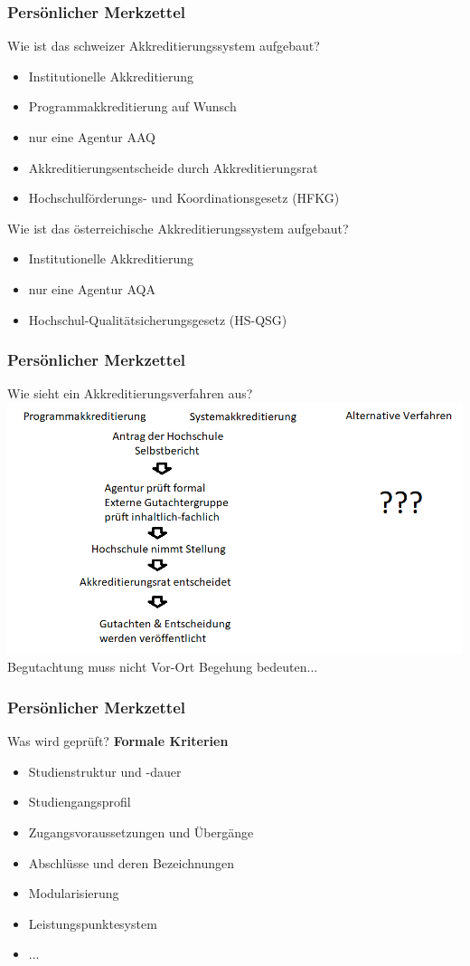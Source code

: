 \documentclass{beamer}
\begin{document}
\begin{frame}
\frametitle{Persönlicher Merkzettel}
Wie ist das schweizer Akkreditierungssystem aufgebaut?
\begin{itemize}
\item Institutionelle Akkreditierung
\item Programmakkreditierung auf Wunsch
\item nur eine Agentur AAQ
\item Akkreditierungsentscheide durch Akkreditierungsrat
\item Hochschulförderungs- und Koordinationsgesetz (HFKG)
\end{itemize}
\pause
Wie ist das österreichische Akkreditierungssystem aufgebaut?
\begin{itemize}
\item Institutionelle Akkreditierung
\item nur eine Agentur AQA
\item Hochschul-Qualitätsicherungsgesetz (HS-QSG)
\end{itemize}
\end{frame}
\begin{frame}
\frametitle{Persönlicher Merkzettel}
Wie sieht ein Akkreditierungsverfahren aus?
\vspace{0.5cm}
  \includegraphics[width=1\textwidth]{verfahren.png}
Begutachtung muss nicht Vor-Ort Begehung bedeuten...
\end{frame}
\begin{frame}
\frametitle{Persönlicher Merkzettel}
Was wird geprüft?
\vspace{0.5cm}
\textbf{Formale Kriterien}
\begin{itemize}
\item Studienstruktur und -dauer
\item Studiengangsprofil
\item Zugangsvoraussetzungen und Übergänge
\item Abschlüsse und deren Bezeichnungen
\item Modularisierung
\item Leistungspunktesystem
\item ...
\end{itemize}
\end{frame}
\end{document}
